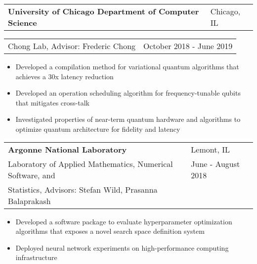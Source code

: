 \documentclass[letterpaper, 12pt]{article}
\begin{document}
\begin{tabular}{@{} L{12cm} @{} R{4.51cm} @{}}
  \textbf{University of Chicago Department of Computer Science} & Chicago, IL \\
\end{tabular}
\begin{tabular}{@{} L{11cm} @{} R{5.51cm} @{}}
  Chong Lab, Advisor: Frederic Chong & October 2018 - June 2019 \\
\end{tabular}
\vspace{-15pt}
\begin{itemize}
  \item Developed a compilation method for variational quantum algorithms that achieves a 30x latency reduction
  \item Developed an operation scheduling algorithm for frequency-tunable qubits that mitigates cross-talk
  \item Investigated properties of near-term quantum hardware and algorithms to optimize quantum architecture for fidelity and latency
\end{itemize}

\begin{tabular}{@{} L{12cm} @{} R{4.51cm} @{}}
  \textbf{Argonne National Laboratory} & Lemont, IL \\
  Laboratory of Applied Mathematics, Numerical Software, and & June - August 2018 \\
  Statistics, Advisors: Stefan Wild, Prasanna Balaprakash & \\
\end{tabular}
\vspace{-10pt}
\begin{itemize}
  \item Developed a software package to evaluate hyperparameter optimization algorithms that exposes a novel search space definition system
  \item Deployed neural network experiments on high-performance computing infrastructure 
\end{itemize}
\end{document}
